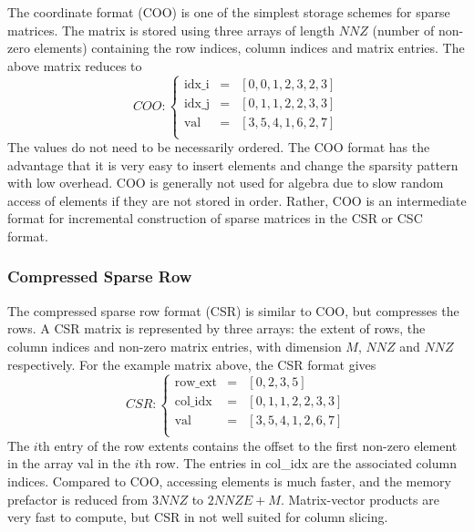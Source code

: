 The coordinate format (COO) is one of the simplest storage schemes for sparse matrices. The matrix is stored using three arrays of length $NNZ$ (number of non-zero elements) containing the row indices, column indices and matrix entries. The above matrix reduces to 
\begin{equation*}
COO: \left\lbrace
\begin{matrix}
\textrm{idx\_i} &= &\left[ 0, 0, 1, 2, 3, 2, 3 \right] \\
\textrm{idx\_j} &= &\left[ 0, 1, 1, 2, 2, 3, 3 \right] \\
\textrm{val}   &= &\left[ 3, 5, 4, 1, 6, 2, 7 \right] \\
\end{matrix}
\right.
\end{equation*}
\noindent The values do not need to be necessarily ordered. The COO format has the advantage that it is very easy to insert elements and change the sparsity pattern with low overhead. COO is generally not used for algebra due to slow random access of elements if they are not stored in order. Rather, COO is an intermediate format for incremental construction of sparse matrices in the CSR or CSC format.

\subsubsection{Compressed Sparse Row}

The compressed sparse row format (CSR) is similar to COO, but compresses the rows. A CSR matrix is represented by three arrays: the extent of rows, the column indices and non-zero matrix entries, with dimension $M$, $NNZ$ and $NNZ$ respectively. For the example matrix above, the CSR format gives
\begin{equation*}
CSR: \left\lbrace
\begin{array}{lll}
\textrm{row\_ext} &= &\left[ 0, 2, 3, 5 \right] \\
\textrm{col\_idx} &= &\left[ 0, 1, 1, 2, 2, 3, 3 \right] \\
\textrm{val}  &= &\left[ 3, 5, 4, 1, 2, 6, 7 \right] \\
\end{array}
\right.
\end{equation*}
\noindent The $i$th entry of the row extents contains the offset to the first non-zero element in the array \textrm{val} in the $i$th row. The entries in \textrm{col\_idx} are the associated column indices. Compared to COO, accessing elements is much faster, and the memory prefactor is reduced from $3NNZ$ to $2NNZE+M$. Matrix-vector products are very fast to compute, but CSR in not well suited for column slicing.

